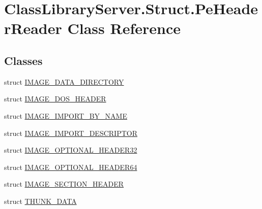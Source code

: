 \hypertarget{class_class_library_server_1_1_struct_1_1_pe_header_reader}{}\section{Class\+Library\+Server.\+Struct.\+Pe\+Header\+Reader Class Reference}
\label{class_class_library_server_1_1_struct_1_1_pe_header_reader}
\subsection*{Classes}
\begin{DoxyCompactItemize}
\item 
struct \mbox{\hyperlink{struct_class_library_server_1_1_struct_1_1_pe_header_reader_1_1_i_m_a_g_e___d_a_t_a___d_i_r_e_c_t_o_r_y}{I\+M\+A\+G\+E\+\_\+\+D\+A\+T\+A\+\_\+\+D\+I\+R\+E\+C\+T\+O\+RY}}
\item 
struct \mbox{\hyperlink{struct_class_library_server_1_1_struct_1_1_pe_header_reader_1_1_i_m_a_g_e___d_o_s___h_e_a_d_e_r}{I\+M\+A\+G\+E\+\_\+\+D\+O\+S\+\_\+\+H\+E\+A\+D\+ER}}
\item 
struct \mbox{\hyperlink{struct_class_library_server_1_1_struct_1_1_pe_header_reader_1_1_i_m_a_g_e___i_m_p_o_r_t___b_y___n_a_m_e}{I\+M\+A\+G\+E\+\_\+\+I\+M\+P\+O\+R\+T\+\_\+\+B\+Y\+\_\+\+N\+A\+ME}}
\item 
struct \mbox{\hyperlink{struct_class_library_server_1_1_struct_1_1_pe_header_reader_1_1_i_m_a_g_e___i_m_p_o_r_t___d_e_s_c_r_i_p_t_o_r}{I\+M\+A\+G\+E\+\_\+\+I\+M\+P\+O\+R\+T\+\_\+\+D\+E\+S\+C\+R\+I\+P\+T\+OR}}
\item 
struct \mbox{\hyperlink{struct_class_library_server_1_1_struct_1_1_pe_header_reader_1_1_i_m_a_g_e___o_p_t_i_o_n_a_l___h_e_a_d_e_r32}{I\+M\+A\+G\+E\+\_\+\+O\+P\+T\+I\+O\+N\+A\+L\+\_\+\+H\+E\+A\+D\+E\+R32}}
\item 
struct \mbox{\hyperlink{struct_class_library_server_1_1_struct_1_1_pe_header_reader_1_1_i_m_a_g_e___o_p_t_i_o_n_a_l___h_e_a_d_e_r64}{I\+M\+A\+G\+E\+\_\+\+O\+P\+T\+I\+O\+N\+A\+L\+\_\+\+H\+E\+A\+D\+E\+R64}}
\item 
struct \mbox{\hyperlink{struct_class_library_server_1_1_struct_1_1_pe_header_reader_1_1_i_m_a_g_e___s_e_c_t_i_o_n___h_e_a_d_e_r}{I\+M\+A\+G\+E\+\_\+\+S\+E\+C\+T\+I\+O\+N\+\_\+\+H\+E\+A\+D\+ER}}
\item 
struct \mbox{\hyperlink{struct_class_library_server_1_1_struct_1_1_pe_header_reader_1_1_t_h_u_n_k___d_a_t_a}{T\+H\+U\+N\+K\+\_\+\+D\+A\+TA}}
\end{DoxyCompactItemize}
